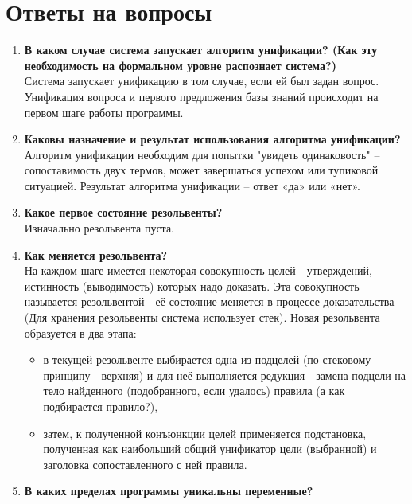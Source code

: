 \newpage
\section*{Ответы на вопросы}
\begin{enumerate}
    \item \textbf{В каком случае система запускает алгоритм унификации? (Как эту необходимость на формальном уровне распознает система?)}\\ 
      Система запускает унификацию в том случае, если ей был задан вопрос. Унификация вопроса и первого предложения базы знаний происходит на первом шаге работы программы. 
    
  
    
    \item \textbf{Каковы назначение и результат использования алгоритма унификации? }\\
    Алгоритм унификации необходим для попытки "увидеть одинаковость" – сопоставимость двух термов, может завершаться успехом или тупиковой ситуацией. Результат алгоритма унификации – ответ «да» или «нет». 
    
    \item \textbf{Какое первое состояние резольвенты?}\\
    Изначально резольвента  пуста.

    \item \textbf{Как меняется резольвента?}\\
   	На каждом шаге имеется некоторая совокупность целей - утверждений, истинность (выводимость) которых надо доказать. Эта совокупность называется резольвентой - её состояние меняется в процессе доказательства (Для хранения резольвенты система использует стек). 
   	Новая резольвента образуется в два этапа:
   	\begin{itemize}
   		\item в текущей резольвенте выбирается одна из подцелей (по стековому принципу - верхняя) и для неё выполняется редукция - замена подцели на тело найденного (подобранного, если удалось) правила (а как подбирается правило?),
   		\item затем, к полученной конъюнкции целей применяется подстановка, полученная как наибольший общий унификатор цели (выбранной) и заголовка сопоставленного с ней правила.
   	\end{itemize}	
	
    \item \textbf{В каких пределах программы уникальны переменные? }\\


\end{enumerate}
